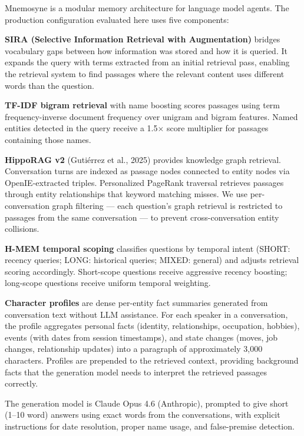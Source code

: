 \documentclass[11pt]{article}
\begin{document}
Mnemosyne is a modular memory architecture for language model agents. The production configuration evaluated here uses five components:

\textbf{SIRA (Selective Information Retrieval with Augmentation)} bridges vocabulary gaps between how information was stored and how it is queried. It expands the query with terms extracted from an initial retrieval pass, enabling the retrieval system to find passages where the relevant content uses different words than the question.

\textbf{TF-IDF bigram retrieval} with name boosting scores passages using term frequency-inverse document frequency over unigram and bigram features. Named entities detected in the query receive a 1.5$\times$ score multiplier for passages containing those names.

\textbf{HippoRAG v2} (Gutiérrez et al., 2025) provides knowledge graph retrieval. Conversation turns are indexed as passage nodes connected to entity nodes via OpenIE-extracted triples. Personalized PageRank traversal retrieves passages through entity relationships that keyword matching misses. We use per-conversation graph filtering --- each question's graph retrieval is restricted to passages from the same conversation --- to prevent cross-conversation entity collisions.

\textbf{H-MEM temporal scoping} classifies questions by temporal intent (SHORT: recency queries; LONG: historical queries; MIXED: general) and adjusts retrieval scoring accordingly. Short-scope questions receive aggressive recency boosting; long-scope questions receive uniform temporal weighting.

\textbf{Character profiles} are dense per-entity fact summaries generated from conversation text without LLM assistance. For each speaker in a conversation, the profile aggregates personal facts (identity, relationships, occupation, hobbies), events (with dates from session timestamps), and state changes (moves, job changes, relationship updates) into a paragraph of approximately 3,000 characters. Profiles are prepended to the retrieved context, providing background facts that the generation model needs to interpret the retrieved passages correctly.

The generation model is Claude Opus 4.6 (Anthropic), prompted to give short (1--10 word) answers using exact words from the conversations, with explicit instructions for date resolution, proper name usage, and false-premise detection.
\end{document}
